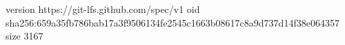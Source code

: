 version https://git-lfs.github.com/spec/v1
oid sha256:659a35fb786bab17a3f9506134fe2545c1663b08617c8a9d737d14f38e064357
size 3167
